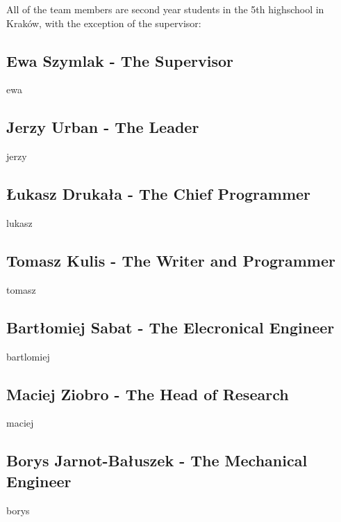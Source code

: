 \documentclass[class=report, crop=false]{standalone}
\begin{document}
All of the team members are second year students in the 5th highschool in Kraków, with the exception of the supervisor:
\subsection*{Ewa Szymlak - The Supervisor}
{ewa}
\subsection*{Jerzy Urban - The Leader}
{jerzy}
\subsection*{Łukasz Drukała - The Chief Programmer}
{lukasz}
\subsection*{Tomasz Kulis - The Writer and Programmer}
{tomasz}
\subsection*{Bartłomiej Sabat - The Elecronical Engineer}
{bartlomiej}
\subsection*{Maciej Ziobro - The Head of Research}
{maciej}
\subsection*{Borys Jarnot-Bałuszek - The Mechanical Engineer}
{borys}
\end{document}
